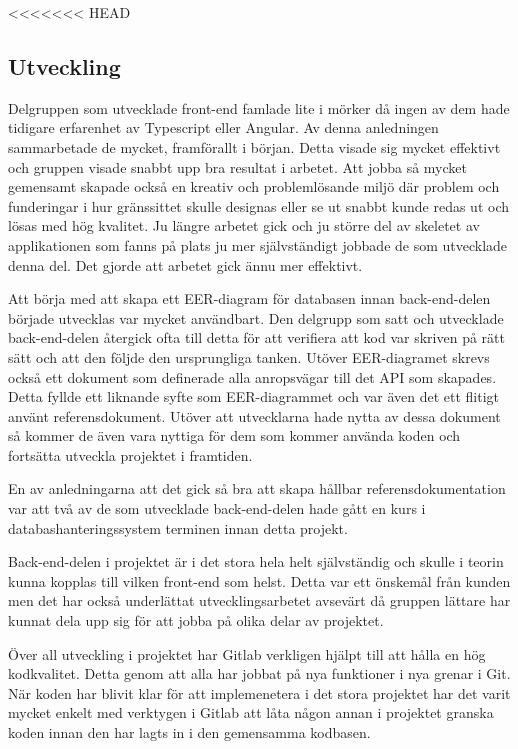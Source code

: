 <<<<<<< HEAD
\subsection{Utveckling}
Delgruppen som utvecklade front-end famlade lite i mörker då ingen av dem hade tidigare erfarenhet av Typescript eller Angular. Av denna anledningen sammarbetade de mycket, framförallt i början. Detta visade sig mycket effektivt och gruppen visade snabbt upp bra resultat i arbetet. Att jobba så mycket gemensamt skapade också en kreativ och problemlösande miljö där problem och funderingar i hur gränssittet skulle designas eller se ut snabbt kunde redas ut och lösas med hög kvalitet. Ju längre arbetet gick och ju större del av skeletet av applikationen som fanns på plats ju mer självständigt jobbade de som utvecklade denna del. Det gjorde att arbetet gick ännu mer effektivt.

Att börja med att skapa ett EER-diagram för databasen innan back-end-delen började utvecklas var mycket användbart. Den delgrupp som satt och utvecklade back-end-delen återgick ofta till detta för att verifiera att kod var skriven på rätt sätt och att den följde den ursprungliga tanken. Utöver EER-diagramet skrevs också ett dokument som definerade alla anropsvägar till det API som skapades. Detta fyllde ett liknande syfte som EER-diagrammet och var även det ett flitigt använt referensdokument. Utöver att utvecklarna hade nytta av dessa dokument så kommer de även vara nyttiga för dem som kommer använda koden och fortsätta utveckla projektet i framtiden.

En av anledningarna att det gick så bra att skapa hållbar referensdokumentation var att två av de som utvecklade back-end-delen hade gått en kurs i databashanteringssystem terminen innan detta projekt.

Back-end-delen i projektet är i det stora hela helt självständig och skulle i teorin kunna kopplas till vilken front-end som helst. Detta var ett önskemål från kunden men det har också underlättat utvecklingsarbetet avsevärt då gruppen lättare har kunnat dela upp sig för att jobba på olika delar av projektet.

Över all utveckling i projektet har Gitlab verkligen hjälpt till att hålla en hög kodkvalitet. Detta genom att alla har jobbat på nya funktioner i nya grenar i Git. När koden har blivit klar för att implemenetera i det stora projektet har det varit mycket enkelt med verktygen i Gitlab att låta någon annan i projektet granska koden innan den har lagts in i den gemensamma kodbasen.

